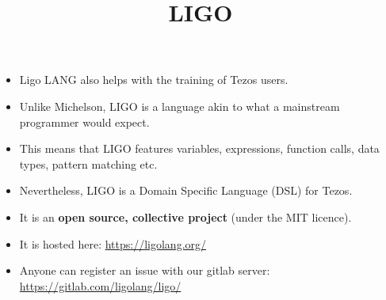 \documentclass[wide]{slides}
\begin{document}
\begin{slide}
  \title{LIGO}

  \begin{itemize}

    \item Ligo LANG also helps with the training of Tezos users.

    \item Unlike Michelson, LIGO is a language akin to what a
      mainstream programmer would expect.

    \item This means that LIGO features variables, expressions,
      function calls, data types, pattern matching etc.

    \item Nevertheless, LIGO is a Domain Specific Language (DSL) for
      Tezos.

    \item It is an \textbf{open source, collective project} (under the
      MIT licence).

    \item It is hosted here: \url{https://ligolang.org/}

    \item Anyone can register an issue with our gitlab server:\\
      \url{https://gitlab.com/ligolang/ligo/}

  \end{itemize}

\end{slide}
\end{document}
